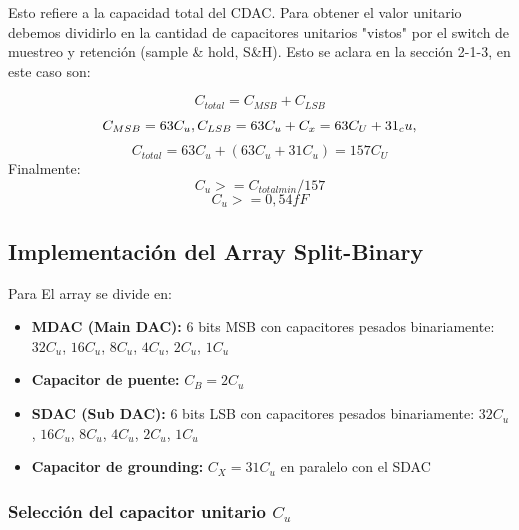 \documentclass[12pt,a4paper]{report}
\begin{document}
Esto refiere a la capacidad total del CDAC. Para obtener el valor unitario debemos dividirlo en la cantidad de capacitores unitarios "vistos" por el switch de muestreo y retención (sample \& hold, S\&H). Esto se aclara en la sección 2-1-3, en este caso son:

\begin{equation}
C_{total} = C_{MSB} + C_{LSB}  
\end{equation}
\begin{equation}
 C_{MSB}=63C_u  \space , \space  C_{LSB} = 63 C_u + C_x=63C_U + 31_cu  \space , \space 
\end{equation}
\begin{equation}
C_{total} = 63C_u + (63C_u+31C_u) = 157C_U
\end{equation}
Finalmente:
\begin{equation}
C_u >= C_{totalmin}/157
\end{equation}
\begin{equation}
C_u >= 0,54 fF
\end{equation}

\subsection{Implementación del Array Split-Binary}
Para 
El array se divide en:
\begin{itemize}
    \item \textbf{MDAC (Main DAC):} 6 bits MSB con capacitores pesados binariamente: $32C_u$, $16C_u$, $8C_u$, $4C_u$, $2C_u$, $1C_u$
    \item \textbf{Capacitor de puente:} $C_B = 2C_u$
    \item \textbf{SDAC (Sub DAC):} 6 bits LSB con capacitores pesados binariamente: $32C_u$, $16C_u$, $8C_u$, $4C_u$, $2C_u$, $1C_u$
    \item \textbf{Capacitor de grounding:} $C_X = 31C_u$ en paralelo con el SDAC
\end{itemize}

\subsubsection{Selección del capacitor unitario $C_u$}
\end{document}
